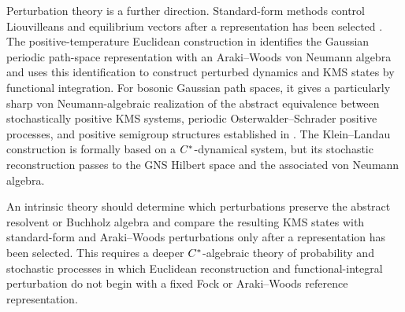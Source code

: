 \documentclass[11pt,a4paper]{article}
\theoremstyle{plain}
\theoremstyle{definition}
\theoremstyle{remark}
\begin{document}
Perturbation theory is a further direction. Standard-form methods control Liouvilleans and equilibrium vectors after a representation has been selected \cite{DerezinskiJaksicPillet001}. The positive-temperature Euclidean construction in \cite[Sections 17.1.5 and 21.4--21.5]{DerezinskiGerard001} identifies the Gaussian periodic path-space representation with an Araki--Woods von Neumann algebra and uses this identification to construct perturbed dynamics and KMS states by functional integration. For bosonic Gaussian path spaces, it gives a particularly sharp von Neumann-algebraic realization of the abstract equivalence between stochastically positive KMS systems, periodic Osterwalder--Schrader positive processes, and positive semigroup structures established in \cite[Sections 1 and 6--8]{KleinLandau001}. The Klein--Landau construction is formally based on a \(C^{\ast}\)-dynamical system, but its stochastic reconstruction passes to the GNS Hilbert space and the associated von Neumann algebra.

An intrinsic theory should determine which perturbations preserve the abstract resolvent or Buchholz algebra and compare the resulting KMS states with standard-form and Araki--Woods perturbations only after a representation has been selected. This requires a deeper \(C^{\ast}\)-algebraic theory of probability and stochastic processes in which Euclidean reconstruction and functional-integral perturbation do not begin with a fixed Fock or Araki--Woods reference representation.


\end{document}
